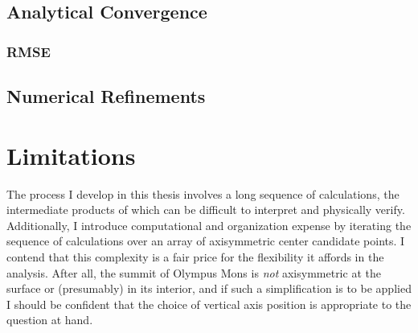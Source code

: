 \subsection{Analytical Convergence}\label{sec:convergence}

\subsubsection{\acs{RMSE}}\label{sec:rmse}

\subsection{Numerical Refinements}

\section{Limitations}

The process I develop in this thesis involves a long sequence of calculations, the intermediate products of which can be difficult to interpret and physically verify. Additionally, I introduce computational and organization expense by iterating the sequence of calculations over an array of axisymmetric center candidate points. I contend that this complexity is a fair price for the flexibility it affords in the analysis. After all, the summit of Olympus Mons is \emph{not} axisymmetric at the surface or (presumably) in its interior, and if such a simplification is to be applied I should be confident that the choice of vertical axis position is appropriate to the question at hand.

